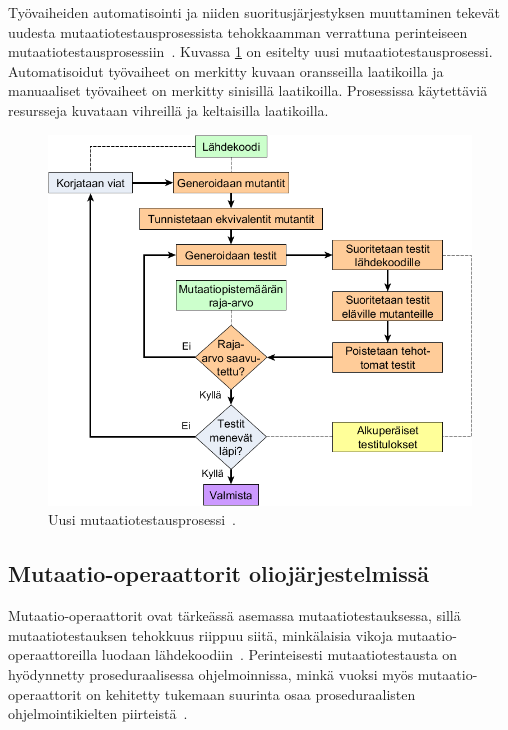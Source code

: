 \documentclass[finnish, grading]{tktltiki2}
\theoremstyle{definition}
\theoremstyle{remark}
\begin{document}
Työvaiheiden automatisointi ja niiden suoritusjärjestyksen muuttaminen tekevät uudesta mutaatiotestausprosessista tehokkaamman verrattuna perinteiseen mutaatiotestausprosessiin~\cite[s. 41]{Offutt:Untch:2001}. Kuvassa \ref{figure:UusiMutaatiotestausprosessi} on esitelty uusi mutaatiotestausprosessi. Automatisoidut työvaiheet on merkitty kuvaan oransseilla laatikoilla ja manuaaliset työvaiheet on merkitty sinisillä laatikoilla. Prosessissa käytettäviä resursseja kuvataan vihreillä ja keltaisilla laatikoilla.

\begin{figure}[H]
	\centering
		\includegraphics[width=\textwidth]{uusiprosessi}
	\caption{Uusi mutaatiotestausprosessi~\cite[s. 41]{Offutt:Untch:2001}.}
	\label{figure:UusiMutaatiotestausprosessi}
\end{figure}


\subsection{Mutaatio-operaattorit oliojärjestelmissä}



Mutaatio-operaattorit ovat tärkeässä asemassa mutaatiotestauksessa, sillä mutaatiotestauksen tehokkuus riippuu siitä, minkälaisia vikoja mutaatio-operaattoreilla luodaan lähdekoodiin~\cite[s. 352]{Ma:Kwon:Offutt:2002}. Perinteisesti mutaatiotestausta on hyödynnetty proseduraalisessa ohjelmoinnissa, minkä vuoksi myös mutaatio-operaattorit on kehitetty tukemaan suurinta osaa proseduraalisten ohjelmointikielten piirteistä~\cite[s. 352]{Ma:Kwon:Offutt:2002}. 
\end{document}
